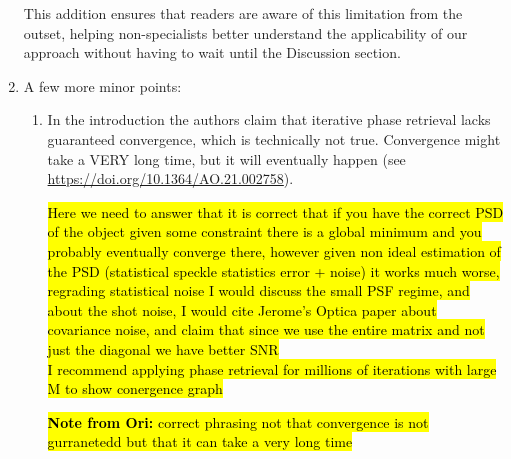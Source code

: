 \documentclass[12pt]{article}
\newcommand{\hlred}[1]{\sethlcolor{red!30}\hl{#1}}
\newcommand{\hlyellow}[1]{\sethlcolor{yellow!50}\hl{#1}}
\newenvironment{reviewercomment}
    {\begin{tcolorbox}[width=\linewidth,colback=gray!5,colframe=commentcolor!50,title=Reviewer Comment,left=5pt,right=5pt]}
    {\end{tcolorbox}}
\newenvironment{ourresponse}
    {\begin{tcolorbox}[width=\linewidth,breakable,enhanced,colback=gray!5,colframe=responsecolor!50,title=Response,left=5pt,right=5pt]}
    {\end{tcolorbox}}
\begin{document}
\begin{enumerate}[label=\arabic*.]
\begin{ourresponse}
        This addition ensures that readers are aware of this limitation from the outset, helping non-specialists better understand the applicability of our approach without having to wait until the Discussion section.
    \end{ourresponse}
    
    \item A few more minor points:
    \begin{enumerate}[label=3.\alph*.]
        \item \leavevmode\vspace{-\baselineskip}
        \begin{reviewercomment}
            In the introduction the authors claim that iterative phase retrieval lacks guaranteed convergence, which is technically not true. Convergence might take a VERY long time, but it will eventually happen (see \url{https://doi.org/10.1364/AO.21.002758}).
        \end{reviewercomment}
           \hlred{Here we need to answer that it is correct that if you have the correct PSD of the object given some constraint there is a global minimum and you probably eventually converge there, however given non ideal estimation of the PSD (statistical speckle statistics error + noise) it works much worse, regrading statistical noise I would discuss the small PSF regime, and about the shot noise, I would cite Jerome's Optica paper about covariance noise, and claim that since we use the entire matrix and not just the diagonal we have better SNR}
           \\
           \hlred{I recommend applying phase retrieval for millions of iterations with large M to show conergence graph}
        \begin{ourresponse}
        \hlyellow{
            \textbf{Note from Ori:}
            correct phrasing not that convergence is not gurranetedd but that it can take a very long time}
        \end{ourresponse}
        

\end{enumerate}
\end{enumerate}
\end{document}
